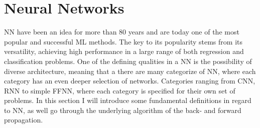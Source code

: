 \section{Neural Networks}\label{sec:NN}
\ac{NN} have been an idea for more than 80 years and are today one of the 
most popular and successful \ac{ML} methods. The key to its popularity stems from
its versatility, achieving high performance in a large range of both regression 
and classification problems. One of the defining qualities in a \ac{NN} is the 
possibility of diverse architecture, meaning that a there are many
categorize of \ac{NN}, where each category has an even deeper selection of
networks. Categories ranging from \ac{CNN}, \ac{RNN} to simple \ac{FFNN}, where each
category is specified for their own set of problems. In this section I will introduce 
some fundamental definitions in regard to \ac{NN}, as well go through the underlying 
algorithm of the back- and forward propagation.

